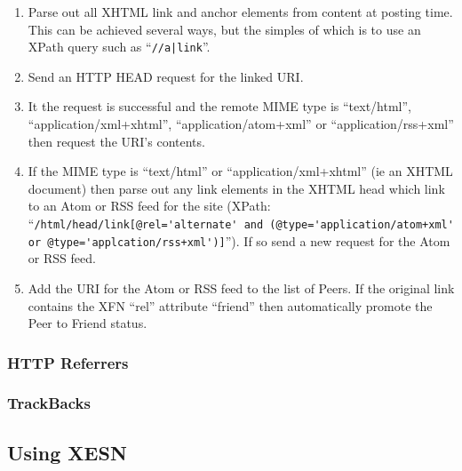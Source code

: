 \documentclass[titlepage,english,a4paper,twoside,dvips]{article}
\begin{document}
\begin{enumerate}

\item Parse out all XHTML link and anchor elements from content at posting time.  This can be achieved several ways, but the simples of which is to use an XPath query such as ``\verb+//a|link+''.

\item Send an HTTP HEAD request for the linked URI.

\item It the request is successful and the remote MIME type is ``text/html'', ``application/xml+xhtml'', ``application/atom+xml'' or ``application/rss+xml'' then request the URI's contents.

\item If the MIME type is ``text/html'' or ``application/xml+xhtml'' (ie an XHTML document) then parse out any link elements in the XHTML head which link to an Atom or RSS feed for the site (XPath: ``\verb|/html/head/link[@rel='alternate' and (@type='application/atom+xml' or @type='applcation/rss+xml')]|'').  If so send a new request for the Atom or RSS feed.

\item Add the URI for the Atom or RSS feed to the list of Peers.  If the original link contains the XFN ``rel'' attribute ``friend'' then automatically promote the Peer to Friend status.

\end{enumerate}


\subsubsection{HTTP Referrers}

\subsubsection{TrackBacks}

\subsection{Using XESN}
\end{document}
